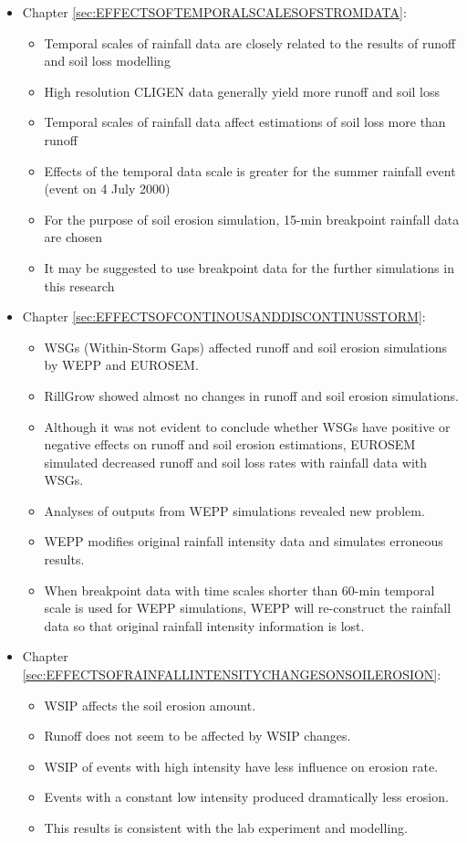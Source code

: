 \begin{itemize}
  \item Chapter \ref{sec:EFFECTSOFTEMPORALSCALESOFSTROMDATA}:
  \begin{itemize}
      \item Temporal scales of rainfall data are closely related to the results
of runoff and soil loss modelling
      \item High resolution CLIGEN data generally yield more runoff and soil
loss
      \item Temporal scales of rainfall data affect estimations of soil loss
more than runoff
      \item Effects of the temporal data scale is greater for the summer
rainfall event (event on 4 July 2000)
      \item For the purpose of soil erosion simulation, 15-min breakpoint
rainfall data are chosen
      \item It may be suggested to use breakpoint data for the further
simulations in this research
  \end{itemize}
  \item Chapter \ref{sec:EFFECTSOFCONTINOUSANDDISCONTINUSSTORM}:
    \begin{itemize}
      \item WSGs (Within-Storm Gaps) affected runoff and soil erosion
simulations by WEPP and EUROSEM.
      \item RillGrow showed almost no changes in runoff and soil erosion
simulations.
      \item Although it was not evident to conclude whether WSGs have
positive or negative effects on runoff and soil erosion estimations, EUROSEM
simulated decreased runoff and soil loss rates with rainfall data with WSGs.
      \item Analyses of outputs from WEPP simulations revealed new problem.
      \item WEPP modifies original rainfall intensity data and simulates
erroneous results.
      \item When breakpoint data with time scales shorter than 60-min temporal
scale is used for WEPP simulations, WEPP will re-construct the rainfall data so
that original rainfall intensity information is lost.
    \end{itemize}
  \item Chapter \ref{sec:EFFECTSOFRAINFALLINTENSITYCHANGESONSOILEROSION}:
    \begin{itemize}
      \item WSIP affects the soil erosion amount.
      \item Runoff does not seem to be affected by WSIP changes.
      \item WSIP of events with high intensity have less influence on erosion
rate.
      \item Events with a constant low intensity produced dramatically less
erosion.
      \item This results is consistent with the lab experiment and modelling.
    \end{itemize}
\end{itemize}

